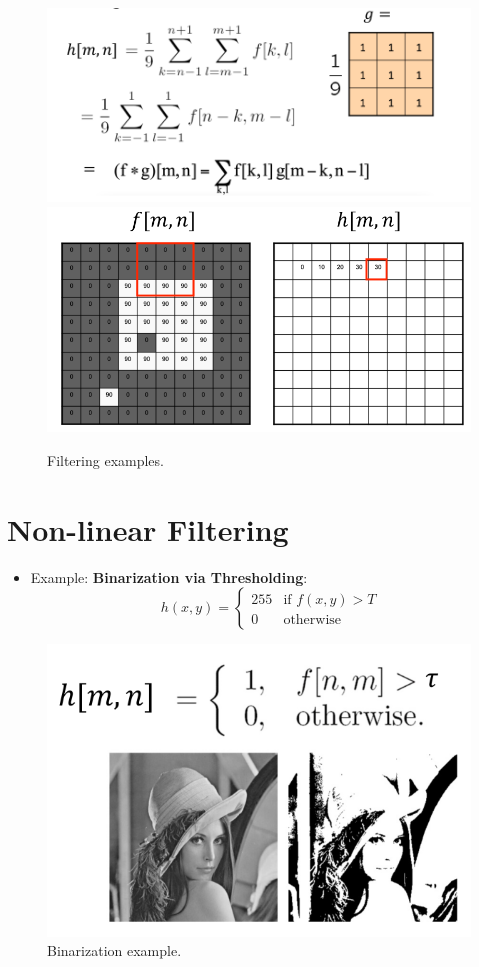 \begin{figure}[htbp]
    \centering
    \includegraphics[scale=0.25]{figures/g.png}
    \includegraphics[scale=0.25]{figures/g2.png}
    \caption{Filtering examples.}
\end{figure}

\section{Non-linear Filtering}
\begin{itemize}
    \item Example: \textbf{Binarization via Thresholding}:
    $$
    h(x,y) = 
    \begin{cases} 
    255 & \text{if } f(x,y) > T \\
    0   & \text{otherwise}
    \end{cases}
    $$
\end{itemize}

\begin{figure}[htbp]
    \centering
    \includegraphics[scale=0.4]{figures/BinarizationviaThresholding.png}
    \caption{Binarization example.}
\end{figure}